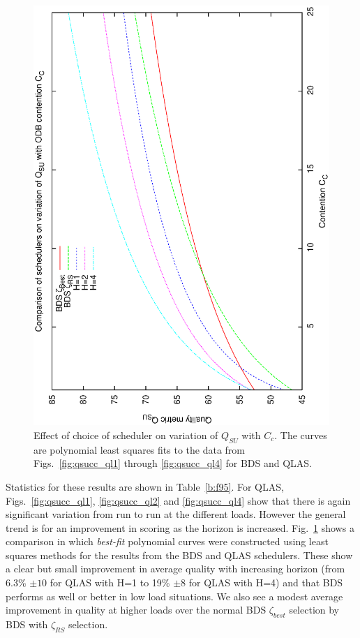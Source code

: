 \begin{figure}[h]

\begin{center}
 \includegraphics[scale=0.5, angle=-90]{figures/qsucc_allfit2.eps}
 \caption[Effect of choice of scheduler on variation of $Q_{SU}$ with $C_c$.] 
   {Effect of choice of scheduler on variation of $Q_{SU}$ with $C_c$.  The curves are polynomial least squares fits to the data from Figs.~\ref{fig:qsucc_ql1} through \ref{fig:qsucc_ql4} for BDS and QLAS.}
 \label{fig:qsucc_allfit}
\end{center}
\end{figure}

Statistics for these results are shown in Table~\ref{b:f95}. For QLAS, Figs.~\ref{fig:qsucc_ql1}, \ref{fig:qsucc_ql2} and \ref{fig:qsucc_ql4} show that there is again significant variation from run to run at the different loads. However the general trend is for an improvement in scoring as the horizon is increased. Fig.~\ref{fig:qsucc_allfit} shows a comparison in which \emph{best-fit} polynomial curves were constructed using least squares methods for the results from the BDS and QLAS schedulers. These show a clear but small improvement in average quality with increasing horizon (from 6.3\% $\pm 10$ for QLAS with H=1 to 19\% $\pm 8$ for QLAS with H=4) and that BDS performs as well or better in low load situations. We also see a modest average improvement in quality at higher loads over the normal BDS $\zeta_{best}$ selection by BDS with $\zeta_{RS}$ selection.


